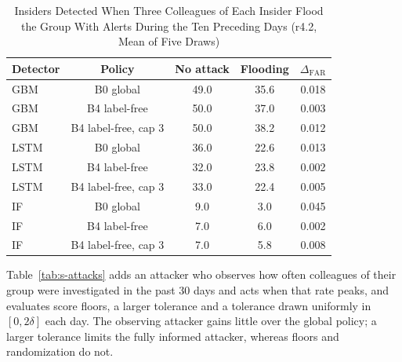 \documentclass[10pt,onecolumn,letterpaper]{article}
\begin{document}
\begin{table}[!t]
\caption{Insiders Detected When Three Colleagues of Each Insider Flood the Group With Alerts During the Ten Preceding Days (r4.2, Mean of Five Draws)\label{tab:s-flood}}
\centering
\setlength{\tabcolsep}{4pt}
\begin{tabular}{lcccc}
\toprule
Detector & Policy & No attack & Flooding & $\Delta_{\mathrm{FAR}}$ \\
\midrule
GBM & B0 global & 49.0 & 35.6 & 0.018 \\
GBM & B4 label-free & 50.0 & 37.0 & 0.003 \\
GBM & B4 label-free, cap 3 & 50.0 & 38.2 & 0.012 \\
LSTM & B0 global & 36.0 & 22.6 & 0.013 \\
LSTM & B4 label-free & 32.0 & 23.8 & 0.002 \\
LSTM & B4 label-free, cap 3 & 33.0 & 22.4 & 0.005 \\
IF & B0 global & 9.0 & 3.0 & 0.045 \\
IF & B4 label-free & 7.0 & 6.0 & 0.002 \\
IF & B4 label-free, cap 3 & 7.0 & 5.8 & 0.008 \\
\bottomrule
\end{tabular}
\end{table}

Table~\ref{tab:s-attacks} adds an attacker who observes how often colleagues of their group were investigated in the past 30 days and acts when that rate peaks, and evaluates score floors, a larger tolerance and a tolerance drawn uniformly in $[0,2\delta]$ each day. The observing attacker gains little over the global policy; a larger tolerance limits the fully informed attacker, whereas floors and randomization do not.
\end{document}
